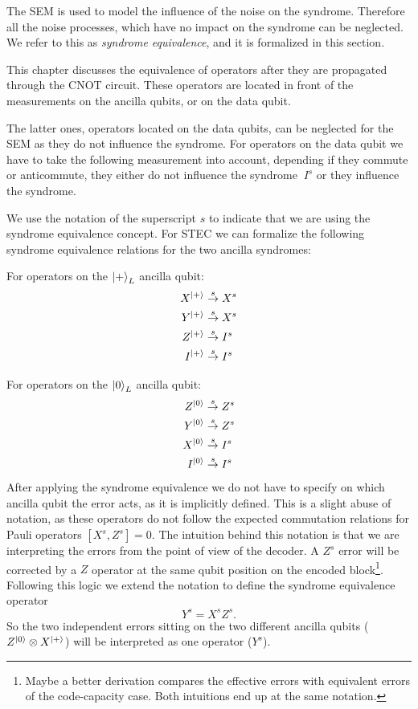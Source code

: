 The SEM is used to model the influence of the noise on the syndrome.
Therefore all the noise processes, which have no impact on the syndrome can be neglected.
We refer to this as \emph{syndrome equivalence}, and it is formalized in this section.

This chapter discusses the equivalence of operators after they are propagated through the CNOT circuit.
These operators are located in front of the measurements on the ancilla qubits, or on the data qubit. 

The latter ones, operators located on the data qubits, can be neglected for the SEM as they do not influence the syndrome.
For operators on the data qubit we have to take the following measurement into account, depending if they commute or anticommute, 
they either do not influence the syndrome $~I^s$ or they influence the syndrome.

We use the notation of the superscript $s$ to indicate that we are using the syndrome equivalence concept.
For STEC we can formalize the following syndrome equivalence relations for the two ancilla syndromes:

For operators on the $\ket{+}_L$ ancilla qubit:
\begin{align*}
    X^{\ket{+}} & \overset{{s}}{\rightarrow} X^{s} \\
    Y^{\ket{+}} & \overset{{s}}{\rightarrow} X^{s} \\
    Z^{\ket{+}} & \overset{{s}}{\rightarrow} I^{s} \\
    I^{\ket{+}} & \overset{{s}}{\rightarrow} I^{s} \\
\end{align*}

For operators on the $\ket{0}_L$ ancilla qubit:
\begin{align*}
    Z^{\ket{0}} & \overset{{s}}{\rightarrow} Z^{s} \\
    Y^{\ket{0}} & \overset{{s}}{\rightarrow} Z^{s} \\
    X^{\ket{0}} & \overset{{s}}{\rightarrow} I^{s} \\
    I^{\ket{0}} & \overset{{s}}{\rightarrow} I^{s} \\
\end{align*}
After applying the syndrome equivalence we do not have to specify on which ancilla qubit the error acts, 
as it is implicitly defined.
This is a slight abuse of notation, as these operators do not follow the expected commutation relations for Pauli operators $[X^s,Z^s]=0$. 
The intuition behind this notation is that we are interpreting the errors from the point of view of the decoder. 
A $Z^s$ error will be corrected by a $Z$ operator at the same qubit position on the encoded block\footnote{
    Maybe a better derivation compares the effective errors with equivalent errors of the code-capacity case. 
    Both intuitions end up at the same notation. 
}.
Following this logic we extend the notation to define the syndrome equivalence operator 
\begin{equation}
    Y^s = X^s Z^s.
\end{equation}
So the two independent errors sitting on the two different ancilla qubits ($Z^{\ket{0}} \otimes X^{\ket{+}}$) will be interpreted as one operator ($Y^s$).

